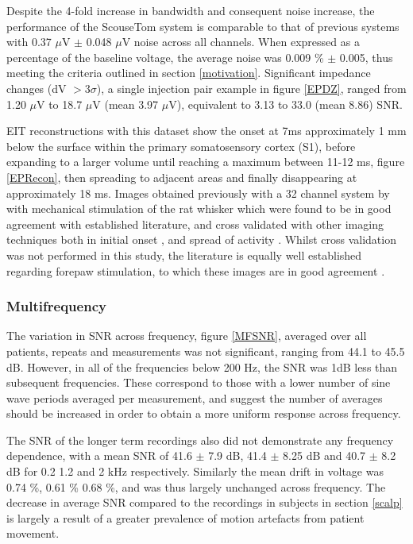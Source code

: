 Despite the 4-fold increase in bandwidth and consequent noise increase, the performance of the ScouseTom system is comparable to that of previous systems \cite{Oh2011} with 0.37 $\mu$V $\pm$ 0.048 $\mu$V noise across all channels. When expressed as a percentage of the baseline voltage, the average noise was 0.009 \% $\pm$ 0.005, thus meeting the criteria outlined in section \ref{motivation}.  Significant impedance changes (dV $> 3\sigma$), a single injection pair example in figure \ref{EPDZ}, ranged from 1.20 $\mu$V to 18.7 $\mu$V (mean 3.97 $\mu$V), equivalent to 3.13 to 33.0 (mean 8.86) SNR. 

EIT reconstructions with this dataset show the onset at 7ms approximately 1 mm below the surface within the primary somatosensory cortex (S1), before expanding to a larger volume until reaching a maximum between 11-12 ms, figure \ref{EPRecon}, then spreading to adjacent areas and finally disappearing at approximately 18 ms. Images obtained previously with a 32 channel system by \citet{Aristovich_2016} with mechanical stimulation of the rat whisker which were found to be in good agreement with established literature, and cross validated with other imaging techniques both in initial onset \cite{armstrong1991thalamo}, and spread of activity \cite{petersen2007functional}. Whilst cross validation was not performed in this study, the literature is equally well established regarding forepaw stimulation, to which these images are in good agreement \cite{peeters2001comparing} \cite{masamoto2007relationship} \cite{lowe2007small}.

\subsubsection{Multifrequency}

The variation in SNR across frequency, figure \ref{MFSNR}, averaged over all patients, repeats and measurements was not significant, ranging from 44.1 to 45.5 dB.  However, in all of the frequencies below 200 Hz, the SNR was 1dB less than subsequent frequencies. These correspond to those with a lower number of sine wave periods averaged per measurement, and suggest the number of averages should be increased in order to obtain a more uniform response across frequency. 

The SNR of the longer term recordings also did not demonstrate any frequency dependence, with a mean SNR of 41.6 $\pm$ 7.9 dB, 41.4 $\pm$ 8.25 dB and 40.7 $\pm$ 8.2 dB for 0.2 1.2 and 2 kHz respectively. Similarly the mean drift in voltage was 0.74 \%, 0.61 \% 0.68 \%, and was thus largely unchanged across frequency. The decrease in average SNR compared to the recordings in subjects in section \ref{scalp} is largely a result of a greater prevalence of motion artefacts from patient movement. 


